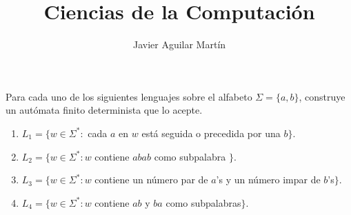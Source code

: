 \documentclass[twoside]{article}
\begin{document}
\title{Ciencias de la Computación}

\author{Javier Aguilar Martín}
\maketitle

\begin{ejercicio}{1}
Para cada uno de los siguientes lenguajes sobre el alfabeto $\Sigma=\{a,b\}$, construye un autómata finito determinista que lo acepte. 
\begin{enumerate}
\item $L_1=\{w\in\Sigma^*:$ cada $a$ en $w$ está seguida o precedida por una $b\}$.
\item $L_2=\{w\in\Sigma^*: w$ contiene $abab$ como subpalabra $\}$.
\item $L_3= \{w\in\Sigma^*: w$ contiene un número par de $a$'s y un número impar de $b$'s$\}$.
\item $L_4= \{w\in\Sigma^*: w$ contiene $ab$ y $ba$ como subpalabras$\}$.
\end{enumerate}
\end{ejercicio}
\end{document}
